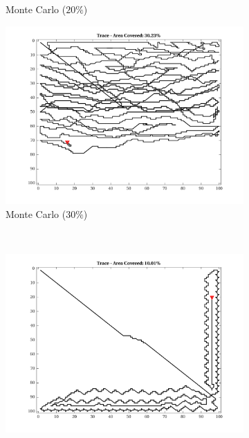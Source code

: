 \begin{figure}[htb!]
\begin{subfigure}[t]{0.32\textwidth}
        \captionsetup{skip=0.20\baselineskip,size=footnotesize}
        \caption{Monte Carlo ($20\%$)}
    \end{subfigure}%
    \begin{subfigure}[t]{0.32\textwidth}
        \centering
        \includegraphics[width=\linewidth]{figures/hbresults/path_mc_30p_100x100_sf_1_seed_2.png}
        \ssp
        \captionsetup{skip=0.20\baselineskip,size=footnotesize}
        \caption{Monte Carlo ($30\%$)}
    \end{subfigure}%
    \\
    \begin{subfigure}[t]{0.32\textwidth}
        \centering
        \includegraphics[width=\linewidth]{figures/hbresults/path_gradient_10p_100x100_sf_1_seed_2.png}

\end{subfigure}
\end{figure}
